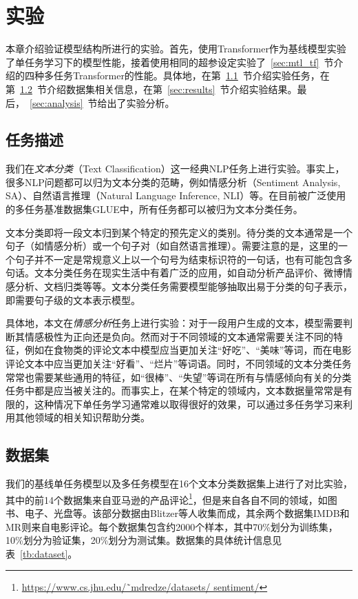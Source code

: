 \chapter{实验}
\label{cha:exp}
本章介绍验证模型结构所进行的实验。首先，使用Transformer作为基线模型实验了单任务学习下的模型性能，接着使用相同的超参设定实验了~\ref{sec:mtl_tf}~节介绍的四种多任务Transformer的性能。具体地，在第~\ref{sec:task}~节介绍实验任务，在第~\ref{sec:ds}~节介绍数据集相关信息，在第~\ref{sec:results}~节介绍实验结果。最后，~\ref{sec:analysis}~节给出了实验分析。

\section{任务描述}
\label{sec:task}
我们在\emph{文本分类}（Text Classification）这一经典NLP任务上进行实验。事实上，很多NLP问题都可以归为文本分类的范畴，例如情感分析（Sentiment Analysis, SA）、自然语言推理（Natural Language Inference, NLI）等。在目前被广泛使用的多任务基准数据集GLUE\cite{DBLP:conf/emnlp/WangSMHLB18}中，所有任务都可以被归为文本分类任务。

文本分类即将一段文本归到某个特定的预先定义的类别。待分类的文本通常是一个句子（如情感分析）或一个句子对（如自然语言推理）。需要注意的是，这里的一个句子并不一定是常规意义上以一个句号为结束标识符的一句话，也有可能包含多句话。文本分类任务在现实生活中有着广泛的应用，如自动分析产品评价、微博情感分析、文档归类等等。文本分类任务需要模型能够抽取出易于分类的句子表示，即需要句子级的文本表示模型。

具体地，本文在\emph{情感分析}任务上进行实验：对于一段用户生成的文本，模型需要判断其情感极性为正向还是负向。然而对于不同领域的文本通常需要关注不同的特征，例如在食物类的评论文本中模型应当更加关注“好吃”、“美味”等词，而在电影评论文本中应当更加关注“好看”、“烂片”等词语。同时，不同领域的文本分类任务常常也需要某些通用的特征，如“很棒”、“失望”等词在所有与情感倾向有关的分类任务中都是应当被关注的。而事实上，在某个特定的领域内，文本数据量常常是有限的，这种情况下单任务学习通常难以取得很好的效果，可以通过多任务学习来利用其他领域的相关知识帮助分类。

\section{数据集}
\label{sec:ds}
我们的基线单任务模型以及多任务模型在16个文本分类数据集上进行了对比实验，其中的前14个数据集来自亚马逊的产品评论\footnote{\url{https://www.cs.jhu.edu/˜mdredze/datasets/ sentiment/}}，但是来自各自不同的领域，如图书、电子、光盘等。该部分数据由Blitzer等人\cite{DBLP:conf/acl/BlitzerDP07}收集而成，其余两个数据集IMDB\cite{DBLP:conf/acl/MaasDPHNP11}和MR\cite{DBLP:conf/acl/PangL05}则来自电影评论。每个数据集包含约2000个样本，其中70\%划分为训练集，10\%划分为验证集，20\%划分为测试集。数据集的具体统计信息见表~\ref{tb:dataset}。

